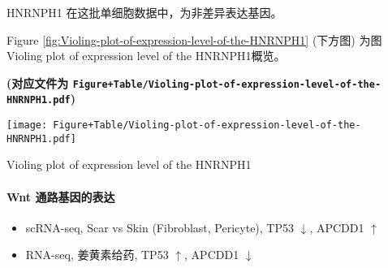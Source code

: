 \documentclass[
]{article}
\newenvironment{Shaded}{\begin{snugshade}}{\end{snugshade}}
\newcommand{\CommentTok}[1]{\textcolor[rgb]{0.56,0.35,0.01}{\textit{#1}}}
\newcommand{\DecValTok}[1]{\textcolor[rgb]{0.00,0.00,0.81}{#1}}
\newcommand{\KeywordTok}[1]{\textcolor[rgb]{0.13,0.29,0.53}{\textbf{#1}}}
\newcommand{\NormalTok}[1]{#1}
\newcommand{\OperatorTok}[1]{\textcolor[rgb]{0.81,0.36,0.00}{\textbf{#1}}}
\newcommand{\StringTok}[1]{\textcolor[rgb]{0.31,0.60,0.02}{#1}}
\providecommand{\tightlist}{%
  \setlength{\itemsep}{0pt}\setlength{\parskip}{0pt}}
\begin{document}
HNRNPH1 在这批单细胞数据中，为非差异表达基因。

\begin{Shaded}
\end{Shaded}

Figure \ref{fig:Violing-plot-of-expression-level-of-the-HNRNPH1} (下方图) 为图Violing plot of expression level of the HNRNPH1概览。

\textbf{(对应文件为 \texttt{Figure+Table/Violing-plot-of-expression-level-of-the-HNRNPH1.pdf})}

\def\@captype{figure}
\begin{center}
\texttt{[image: Figure+Table/Violing-plot-of-expression-level-of-the-HNRNPH1.pdf]}
\caption{Violing plot of expression level of the HNRNPH1}\label{fig:Violing-plot-of-expression-level-of-the-HNRNPH1}
\end{center}

\hypertarget{wnt-ux901aux8defux57faux56e0ux7684ux8868ux8fbe}{%
\paragraph{Wnt 通路基因的表达}\label{wnt-ux901aux8defux57faux56e0ux7684ux8868ux8fbe}}

\begin{itemize}
\tightlist
\item
  scRNA-seq, Scar vs Skin (Fibroblast, Pericyte), TP53 \(\downarrow\), APCDD1 \(\uparrow\)
\item
  RNA-seq, 姜黄素给药, TP53 \(\uparrow\), APCDD1 \(\downarrow\)
\end{itemize}
\end{document}
